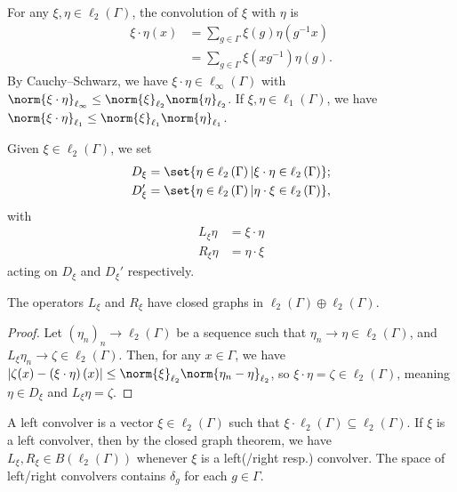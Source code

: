 \documentclass[10pt]{mypackage}
\begin{document}
For any $\xi,\eta\in \ell_2\left( \Gamma \right)$, the convolution of $\xi$ with $\eta$ is
\begin{align*}
  \xi\cdot\eta(x) &= \sum_{g\in \Gamma}\xi(g)\eta\left( g^{-1}x \right)\\
                  &= \sum_{g\in \Gamma} \xi\left( xg^{-1} \right)\eta(g).
\end{align*}
By Cauchy--Schwarz, we have $\xi\cdot\eta\in \ell_{\infty}(\Gamma)$ with $\norm{\xi\cdot\eta}_{\ell_{\infty}}\leq \norm{\xi}_{\ell_2}\norm{\eta}_{\ell_2}$. If $\xi,\eta\in \ell_1\left( \Gamma \right)$, we have $\norm{\xi\cdot\eta}_{\ell_1}\leq \norm{\xi}_{\ell_1}\norm{\eta}_{\ell_1}$.

Given $\xi\in \ell_2\left( \Gamma \right)$, we set
\begin{align*}
  D_{\xi} &= \set{\eta\in \ell_2\left( \Gamma \right) | \xi\cdot\eta\in \ell_2\left( \Gamma \right)};\\
  D_{\xi}' &= \set{\eta\in \ell_2\left( \Gamma \right) | \eta\cdot \xi\in \ell_2\left( \Gamma \right)},
\end{align*}
with
\begin{align*}
  L_{\xi}\eta &= \xi\cdot\eta\\
  R_{\xi}\eta &= \eta\cdot\xi
\end{align*}
acting on $D_{\xi}$ and $D_{\xi}'$ respectively.
\begin{lemma}
  The operators $L_{\xi}$ and $R_{\xi}$ have closed graphs in $\ell_2\left( \Gamma \right)\oplus \ell_2\left( \Gamma \right)$.
\end{lemma}
\begin{proof}
  Let $\left( \eta_n \right)_n\rightarrow \ell_2\left( \Gamma \right)$ be a sequence such that $\eta_n\rightarrow \eta\in \ell_2\left( \Gamma \right)$, and $L_{\xi}\eta_n\rightarrow \zeta\in \ell_2\left( \Gamma \right)$. Then, for any $x\in \Gamma$, we have $ \left\vert \zeta(x)-\left( \xi\cdot\eta \right)(x) \right\vert \leq \norm{\xi}_{\ell_2}\norm{\eta_n-\eta}_{\ell_2} $, so $\xi\cdot\eta = \zeta\in \ell_2\left( \Gamma \right)$, meaning $\eta\in D_{\xi}$ and $L_{\xi}\eta = \zeta$.
\end{proof}
A left convolver is a vector $\xi\in \ell_2\left( \Gamma \right)$ such that $\xi\cdot \ell_2\left( \Gamma \right)\subseteq \ell_2\left( \Gamma \right)$. If $\xi$ is a left convolver, then by the closed graph theorem, we have $L_{\xi},R_{\xi}\in B\left( \ell_2\left( \Gamma \right) \right)$ whenever $\xi$ is a left(/right resp.) convolver. The space of left/right convolvers contains $\delta_g$ for each $g\in \Gamma$.
\end{document}
